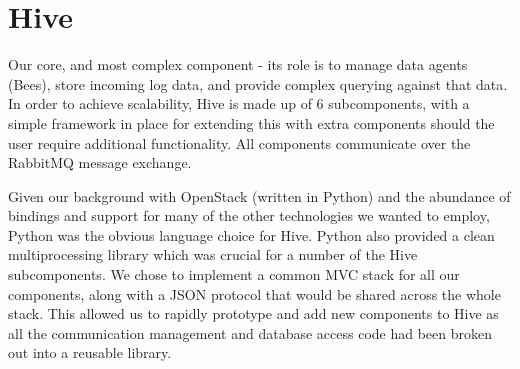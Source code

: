 \section{Hive}

Our core, and most complex component - its role is to manage data agents (Bees),
store incoming log data, and provide complex querying against that data. In
order to achieve scalability, Hive is made up of 6 subcomponents, with a simple
framework in place for extending this with extra components should the user
require additional functionality. All components communicate over the RabbitMQ
message exchange.

Given our background with OpenStack\cite{os} (written in Python) and the abundance of
bindings and support for many of the other technologies we wanted to employ,
Python was the obvious language choice for Hive. Python also provided a clean
multiprocessing library which was crucial for a number of the Hive
subcomponents. We chose to implement a common MVC stack for all our components,
along with a JSON protocol that would be shared across the whole stack. This
allowed us to rapidly prototype and add new components to Hive as all the
communication management and database access code had been broken out into a
reusable library.

